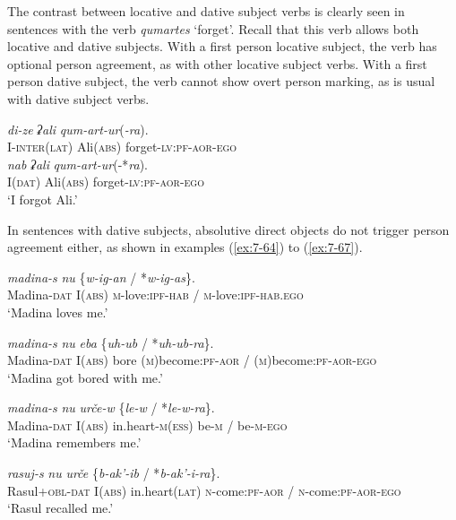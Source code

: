 ﻿\documentclass[output=paper]{langsci/langscibook}
\begin{document}
The contrast between locative and dative subject verbs is clearly seen
in sentences with the verb \emph{qumartes} `forget'. Recall that this
verb allows both locative and dative subjects. With a first person
locative subject, the verb has optional person agreement, as with other
locative subject verbs. With a first person dative subject, the verb
cannot show overt person marking, as is usual with dative subject verbs.

\ea %
\ea %
\gll \emph{di-ze} \emph{ʡali} \emph{qum-art-ur}(\emph{-ra}).\\
I-\textsc{inter(lat)} Ali(\textsc{abs}) forget-\textsc{lv}:\textsc{pf}-\textsc{aor}-\textsc{ego}\\

\ex %
\gll \emph{nab} \emph{ʡali} \emph{qum-art-ur}(-*\emph{ra}).\\
I(\textsc{dat}) Ali(\textsc{abs}) forget-\textsc{lv}:\textsc{pf}-\textsc{aor}-\textsc{ego}\\
\glt `I forgot Ali.'
\z
\z

In sentences with dative subjects, absolutive direct objects do not
trigger person agreement either, as shown in examples (\ref{ex:7-64}) to (\ref{ex:7-67}).

\ea\label{ex:7-64}
\gll \emph{madina-s} \emph{nu} \{\emph{w-ig-an} / *\emph{w-ig-as}\}.\\
Madina-\textsc{dat} I(\textsc{abs}) \textsc{m}-love:\textsc{ipf}-\textsc{hab} / \textsc{m}-love:\textsc{ipf}-\textsc{hab}.\textsc{ego}\\
\glt `Madina loves me.'

\ex %
\gll \emph{madina-s} \emph{nu} \emph{eba} \{\emph{uh-ub} / *\emph{uh-ub-ra}\}.\\
Madina-\textsc{dat} I(\textsc{abs}) bore (\textsc{m})become:\textsc{pf}-\textsc{aor} / (\textsc{m})become:\textsc{pf}-\textsc{aor}-\textsc{ego}\\
\glt `Madina got bored with me.'

\ex %
\gll \emph{madina-s} \emph{nu} \emph{urče-w} \{\emph{le-w} / *\emph{le-w-ra}\}.\\
Madina-\textsc{dat} I(\textsc{abs}) in.heart-\textsc{m(ess)} {be}-\textsc{m} / {be}-\textsc{m}-\textsc{ego}\\ \unskip
\glt `Madina remembers me.'

\ex \label{ex:7-67}
\gll \emph{rasuj-s} \emph{nu} \emph{urče} \{\emph{b-ak'-ib} / *\emph{b-ak'-i-ra}\}.\\
Rasul+\textsc{obl}-\textsc{dat} I(\textsc{abs}) in.heart(\textsc{lat}) \textsc{n}-come:\textsc{pf}-\textsc{aor} / \textsc{n}-come:\textsc{pf}-\textsc{aor}-\textsc{ego}\\ 
\glt `Rasul recalled me.'
\z
\end{document}
